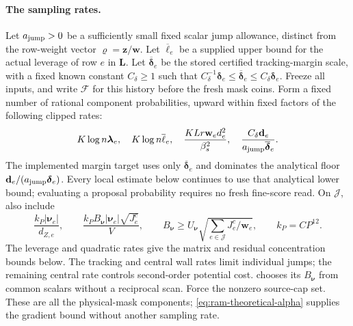\documentclass[11pt]{article}
\theoremstyle{remark}
\newcommand{\LL}{\mathbf L}
\newcommand{\llambda}{\boldsymbol{\lambda}}
\newcommand{\ww}{\mathbf w}
\newcommand{\zz}{\mathbf z}
\newcommand{\vvr}{\boldsymbol{\varrho}}
\newcommand{\dd}{\mathbf d}
\newcommand{\nnu}{\boldsymbol{\nu}}
\newcommand{\ddelta}{\boldsymbol{\delta}}
\newcommand{\ddeltabar}{\overline{\boldsymbol{\delta}}}
\begin{document}
\paragraph{The sampling rates.}
Let $a_{\rm jump}>0$ be a sufficiently small fixed scalar jump allowance,
distinct from the row-weight vector $\vvr=\zz/\ww$.
Let $\overline\ell_e$ be a supplied upper bound for the actual leverage of row
$e$ in $\LL$.
Let $\ddeltabar_e$ be the stored certified tracking-margin scale, with a fixed
known constant $C_\delta\ge1$ such that $C_\delta^{-1}\ddelta_e\le\ddeltabar_e\le
C_\delta\ddelta_e$.
Freeze all inputs, and write $\mathcal F$ for this history before the fresh mask
coins.
Form a fixed number of rational component probabilities, upward within fixed
factors of the following clipped rates:
\begin{equation}
 K\log n\llambda_e,\quad K\log n\overline\ell_e,\quad
 \frac{KLr \ww_ed_e^2}{\beta_s^2},\quad
 \frac{C_\delta \dd_e}{a_{\rm jump}\ddeltabar_e}.
 \label{eq:ram-core-floors}
\end{equation}
The implemented margin target uses only $\ddeltabar_e$ and dominates the
analytical floor $\dd_e/(a_{\rm jump}\ddelta_e)$.
Every local estimate below continues to use that analytical lower bound;
evaluating a proposal probability requires no fresh fine-score read.
On $\mathcal J$, also include
\begin{equation}
 \frac{k_P|\nnu_e|}{d_{Z,e}},\qquad
 \frac{k_P B_{\nnu}|\nnu_e|\sqrt{J^c_e}}{V},\qquad
 B_{\nnu}\ge U_{\nnu}\sqrt{\sum_{e\in\mathcal J}J^c_e/\ww_e},
 \qquad k_P=C P^{12}.
 \label{eq:ram-central-floors}
\end{equation}
The leverage and quadratic rates give the matrix and residual concentration
bounds below.
The tracking and central wall rates limit individual jumps; the remaining
central rate controls second-order potential cost.
 chooses its $B_{\nnu}$ from common scalars without
a reciprocal scan.
Force the nonzero source-cap set.
These are all the physical-mask components; \eqref{eq:ram-theoretical-alpha}
supplies the gradient bound without another sampling rate.
\end{document}
